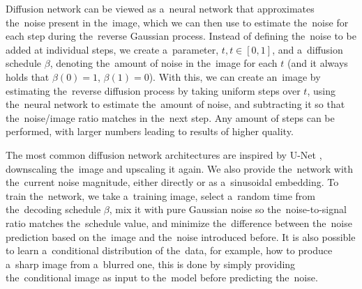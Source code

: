Diffusion network can be viewed as a~neural network that approximates the~noise present in the~image, which we can then use to estimate the~noise for each step during the~reverse Gaussian process. Instead of defining the~noise to be added at individual steps, we create a~parameter, $t, t \in [0, 1]$, and a~diffusion schedule $\beta$, denoting the~amount of noise in the~image for each $t$ (and it always holds that $\beta(0) = 1$, $\beta(1)=0$). With this, we can create an~image by estimating the~reverse diffusion process by taking uniform steps over $t$, using the~neural network to estimate the~amount of noise, and subtracting it so that the~noise/image ratio matches in the~next step. Any amount of steps can be performed, with larger numbers leading to results of higher quality.

The most common diffusion network architectures are inspired by U-Net \citep{u_net}, downscaling the~image and upscaling it again. We also provide the~network with the~current noise magnitude, either directly or as a~sinusoidal embedding. To train the~network, we take a~training image, select a~random time from the~decoding schedule $\beta$, mix it with pure Gaussian noise so the~noise-to-signal ratio matches the~schedule value, and minimize the~difference between the~noise prediction based on the~image and the~noise introduced before. It is also possible to learn a~conditional distribution of the~data, for example, how to produce a~sharp image from a~blurred one, this is done by simply providing the~conditional image as input to the~model before predicting the~noise.

